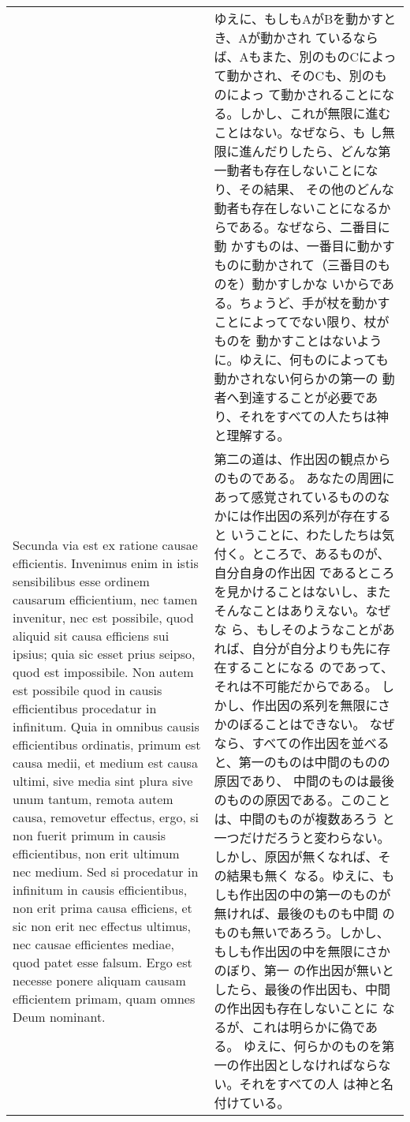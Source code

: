 \documentclass[10pt]{jsarticle} %
\begin{document}
\begin{longtable}{p{21em}p{21em}}
&




ゆえに、もしもAがBを動かすとき、Aが動かされ
ているならば、Aもまた、別のものCによって動かされ、そのCも、別のものによっ
て動かされることになる。しかし、これが無限に進むことはない。なぜなら、も
し無限に進んだりしたら、どんな第一動者も存在しないことになり、その結果、
その他のどんな動者も存在しないことになるからである。なぜなら、二番目に動
かすものは、一番目に動かすものに動かされて（三番目のものを）動かすしかな
いからである。ちょうど、手が杖を動かすことによってでない限り、杖がものを
動かすことはないように。ゆえに、何ものによっても動かされない何らかの第一の
動者へ到達することが必要であり、それをすべての人たちは神と理解する。



\\

Secunda via est ex ratione causae
efficientis. Invenimus enim in istis sensibilibus esse ordinem causarum
efficientium, nec tamen invenitur, nec est possibile, quod aliquid sit
causa efficiens sui ipsius; quia sic esset prius seipso, quod est
impossibile. Non autem est possibile quod in causis efficientibus
procedatur in infinitum. Quia in omnibus causis efficientibus ordinatis,
primum est causa medii, et medium est causa ultimi, sive media sint
plura sive unum tantum, remota autem causa, removetur effectus, ergo, si
non fuerit primum in causis efficientibus, non erit ultimum nec
medium. Sed si procedatur in infinitum in causis efficientibus, non erit
prima causa efficiens, et sic non erit nec effectus ultimus, nec causae
efficientes mediae, quod patet esse falsum. Ergo est necesse ponere
aliquam causam efficientem primam, quam omnes Deum nominant. 



&

第二の道は、作出因の観点からのものである。
あなたの周囲にあって感覚されているもののなかには作出因の系列が存在すると
 いうことに、わたしたちは気付く。ところで、あるものが、自分自身の作出因
 であるところを見かけることはないし、またそんなことはありえない。なぜな
 ら、もしそのようなことがあれば、自分が自分よりも先に存在することになる
 のであって、それは不可能だからである。
しかし、作出因の系列を無限にさかのぼることはできない。
なぜなら、すべての作出因を並べると、第一のものは中間のものの原因であり、
 中間のものは最後のものの原因である。このことは、中間のものが複数あろう
 と一つだけだろうと変わらない。しかし、原因が無くなれば、その結果も無く
 なる。ゆえに、もしも作出因の中の第一のものが無ければ、最後のものも中間
 のものも無いであろう。しかし、もしも作出因の中を無限にさかのぼり、第一
 の作出因が無いとしたら、最後の作出因も、中間の作出因も存在しないことに
 なるが、これは明らかに偽である。
ゆえに、何らかのものを第一の作出因としなければならない。それをすべての人
 は神と名付けている。




\end{longtable}
\end{document}
